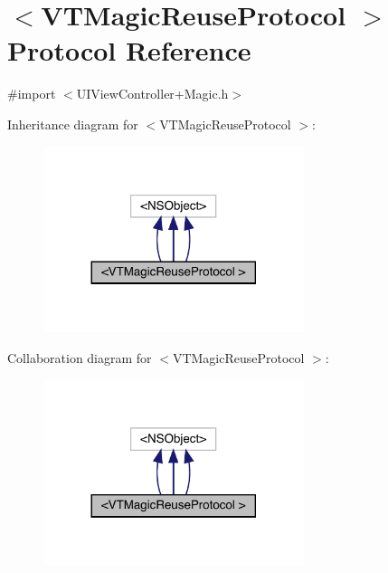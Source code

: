 \hypertarget{protocol_v_t_magic_reuse_protocol_01-p}{}\section{$<$V\+T\+Magic\+Reuse\+Protocol $>$ Protocol Reference}
\label{protocol_v_t_magic_reuse_protocol_01-p}


{\ttfamily \#import $<$U\+I\+View\+Controller+\+Magic.\+h$>$}



Inheritance diagram for $<$V\+T\+Magic\+Reuse\+Protocol $>$\+:\nopagebreak
\begin{figure}[H]
\begin{center}
\leavevmode
\includegraphics[width=216pt]{protocol_v_t_magic_reuse_protocol_01-p__inherit__graph}
\end{center}
\end{figure}


Collaboration diagram for $<$V\+T\+Magic\+Reuse\+Protocol $>$\+:\nopagebreak
\begin{figure}[H]
\begin{center}
\leavevmode
\includegraphics[width=216pt]{protocol_v_t_magic_reuse_protocol_01-p__coll__graph}
\end{center}
\end{figure}
